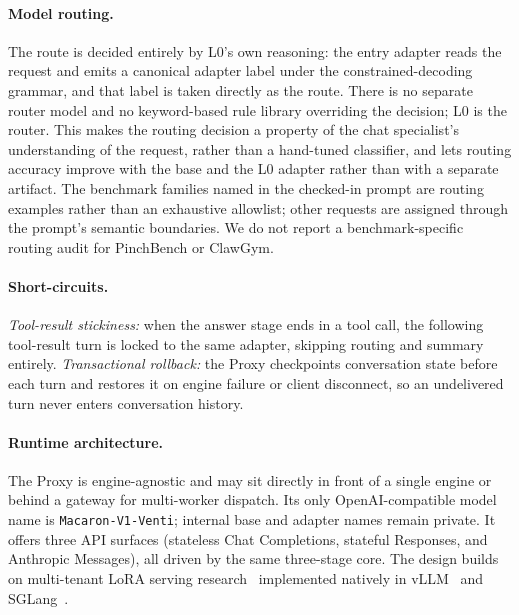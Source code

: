 \paragraph{Model routing.}
The route is decided entirely by L0's own reasoning: the entry adapter reads the request and emits a canonical adapter label under the constrained-decoding grammar, and that label is taken directly as the route. There is no separate router model and no keyword-based rule library overriding the decision; L0 is the router. This makes the routing decision a property of the chat specialist's understanding of the request, rather than a hand-tuned classifier, and lets routing accuracy improve with the base and the L0 adapter rather than with a separate artifact.
The benchmark families named in the checked-in prompt are routing examples rather than an exhaustive allowlist; other requests are assigned through the prompt's semantic boundaries. We do not report a benchmark-specific routing audit for PinchBench or ClawGym.

\paragraph{Short-circuits.}
\emph{Tool-result stickiness:} when the answer stage ends in a tool call, the following tool-result turn is locked to the same adapter, skipping routing and summary entirely. \emph{Transactional rollback:} the Proxy checkpoints conversation state before each turn and restores it on engine failure or client disconnect, so an undelivered turn never enters conversation history.

\paragraph{Runtime architecture.}
The Proxy is engine-agnostic and may sit directly in front of a single engine or behind a gateway for multi-worker dispatch. Its only OpenAI-compatible model name is \texttt{Macaron-V1-Venti}; internal base and adapter names remain private. It offers three API surfaces (stateless Chat Completions, stateful Responses, and Anthropic Messages), all driven by the same three-stage core. The design builds on multi-tenant LoRA serving research~\citep{punica2024,slora2023,zhou2025dynamic} implemented natively in vLLM~\citep{vllm2023} and SGLang~\citep{sglang2024}.

